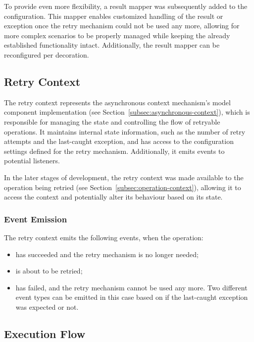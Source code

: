 To provide even more flexibility, a result mapper was subsequently added to the configuration.
This mapper enables customized handling of the result or exception once the retry mechanism could not be used any more,
allowing for more complex scenarios to be properly managed while keeping the already established functionality intact.
Additionally, the result mapper can be reconfigured per decoration.

\subsection{Retry Context}\label{subsec:retry-context}

The retry context represents the asynchronous context mechanism's model component implementation (see Section~\ref{subsec:asynchronous-context}), which is responsible for managing the state and controlling the flow of retryable operations.
It maintains internal state information, such as the number of retry attempts and the last-caught exception,
and has access to the configuration settings defined for the retry mechanism.
Additionally, it emits events to potential listeners.

In the later stages of development,
the retry context was made available to the operation being retried (see Section~\ref{subsec:operation-context}),
allowing it to access the context and potentially alter its behaviour based on its state.

\subsubsection{Event Emission}\label{subsubsec:retry-context-event-emission}

The retry context emits the following events, when the operation:

\begin{itemize}
    \item has succeeded and the retry mechanism is no longer needed;
    \item is about to be retried;
    \item has failed, and the retry mechanism cannot be used any more.
    Two different event types can be emitted in this case based on if the last-caught exception was expected or not.
\end{itemize}

\subsection{Execution Flow}\label{subsec:retry-execution-flow}

